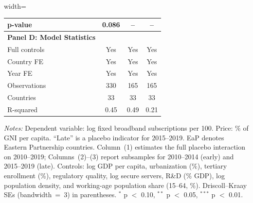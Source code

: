 \begin{table}[!htbp]
\begin{minipage}{\textwidth}
\begin{adjustbox}{width=\textwidth}
\begin{tabular}{@{}lccc@{}}
p-value & 0.086 & -- & -- \\
\midrule
\textbf{Panel D: Model Statistics} \\
Full controls & Yes & Yes & Yes \\
Country FE & Yes & Yes & Yes \\
Year FE & Yes & Yes & Yes \\
Observations & 330 & 165 & 165 \\
Countries & 33 & 33 & 33 \\
R-squared & 0.45 & 0.49 & 0.21 \\
\bottomrule
\end{tabular}
\end{adjustbox}
\par\vspace{2pt}
\tiny
\textit{Notes:} Dependent variable: log fixed broadband subscriptions per 100.
Price: \% of GNI per capita. ``Late'' is a placebo indicator for 2015--2019.
EaP denotes Eastern Partnership countries. Column~(1) estimates the full placebo
interaction on 2010--2019; Columns~(2)--(3) report subsamples for 2010--2014 (early)
and 2015--2019 (late). Controls: log GDP per capita, urbanization (\%), tertiary
enrollment (\%), regulatory quality, log secure servers, R\&D (\% GDP), log population
density, and working-age population share (15--64, \%). Driscoll--Kraay SEs (bandwidth~=~3) in parentheses.
$^{*}$ p $<$ 0.10, $^{**}$ p $<$ 0.05, $^{***}$ p $<$ 0.01.
\end{minipage}
\end{table}
